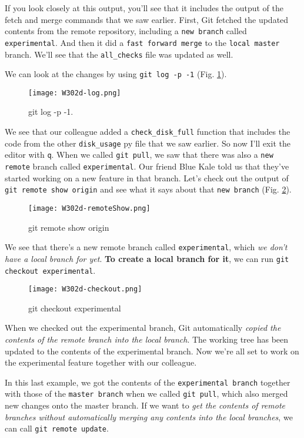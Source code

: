 If you look closely at this output, you'll see that it includes the output of the fetch and merge commands that we saw earlier. First, Git fetched the updated contents from the remote repository, including a \verb|new branch| called \verb|experimental|. And then it did a \verb|fast forward merge| to the \verb|local master| branch. We'll see that the \verb|all_checks| file was updated as well.

We can look at the changes by using \verb|git log -p -1| (Fig. \ref{W302d-log}).

\begin{figure} 
	\caption{git log -p -1.}
	\centering
	\texttt{[image: W302d-log.png]}
	\label{W302d-log}
\end{figure}

We see that our colleague added a \verb|check_disk_full| function that includes the code from the other \verb|disk_usage| py file that we saw earlier. 
So now I'll exit the editor with \verb|q|. When we called \verb|git pull|, we saw that there was also a \verb|new remote| branch called \verb|experimental|. Our friend Blue Kale told us that they've started working on a new feature in that branch. Let's check out the output of \verb|git remote show origin| and see what it says about that \verb|new branch| (Fig. \ref{W302d-remoteShow}).

\begin{figure} 
	\caption{git remote show origin}
	\centering
	\texttt{[image: W302d-remoteShow.png]}
	\label{W302d-remoteShow}
\end{figure}

We see that there's a new remote branch called \verb|experimental|, which \textit{we don't have a local branch for yet}. \textbf{To create a local branch for it}, we can run \verb|git checkout experimental|.

\begin{figure} 
	\caption{git checkout experimental}
	\centering
	\texttt{[image: W302d-checkout.png]}
	\label{W302d-checkout}
\end{figure}

When we checked out the experimental branch, Git automatically \textit{copied the contents of the remote branch into the local branch}. The working tree has been updated to the contents of the experimental branch. Now we're all set to work on the experimental feature together with our colleague. 

In this last example, we got the contents of the \verb|experimental branch| together with those of the \verb|master branch| when we called \verb|git pull|, which also merged new changes onto the master branch. If we want to \textit{get the contents of remote branches without automatically merging any contents into the local branches}, we can call \verb|git remote update|. 


